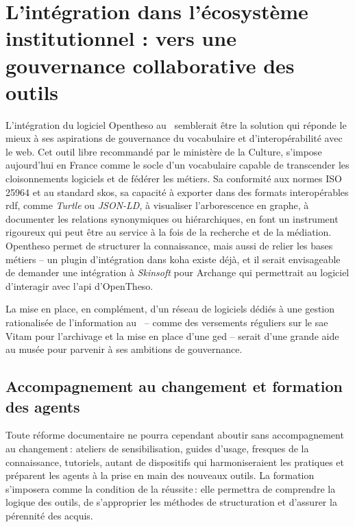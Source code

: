 \section{\label{III-A-3}L’intégration dans l’écosystème institutionnel : vers une gouvernance collaborative des outils}


L’intégration du logiciel Opentheso au \mae~semblerait être la solution qui réponde le mieux à ses aspirations de gouvernance du vocabulaire et d'interopérabilité avec le web. Cet outil libre recommandé par le ministère de la Culture, s’impose aujourd'hui en France comme le socle d’un vocabulaire  capable de transcender les cloisonnements logiciels et de fédérer les métiers. Sa conformité aux normes ISO 25964 et au standard \gls{skos}, sa capacité à exporter dans des formats interopérables \gls{rdf}, comme \textit{Turtle} ou \textit{JSON-LD}, à visualiser l’arborescence en graphe, à documenter les relations synonymiques ou hiérarchiques, en font un instrument rigoureux qui peut être au service à la fois de la recherche et de la médiation. Opentheso permet de structurer la connaissance, mais aussi de relier les bases métiers – un plugin d'intégration dans \gls{koha} existe déjà, et il serait envisageable de demander une intégration à \textit{Skinsoft} pour Archange qui permettrait au logiciel d'interagir avec l'\ac{api} d'OpenTheso.

La mise en place, en complément, d'un réseau de logiciels dédiés à une gestion rationalisée de l'information au \mae~-- comme des versements réguliers sur le \gls{sae} Vitam pour l’archivage et la mise en place d'une \gls{ged} – serait d'une grande aide au musée pour parvenir à ses ambitions de gouvernance.

\subsection{Accompagnement au changement et formation des agents}

Toute réforme documentaire ne pourra cependant aboutir sans accompagnement au changement : ateliers de sensibilisation, guides d’usage, fresques de la connaissance, tutoriels, autant de dispositifs qui harmoniseraient les pratiques et préparent les agents à la prise en main des nouveaux outils. La formation s'imposera comme la condition de la réussite : elle permettra de comprendre la logique des outils, de s’approprier les méthodes de structuration et d’assurer la pérennité des acquis.

